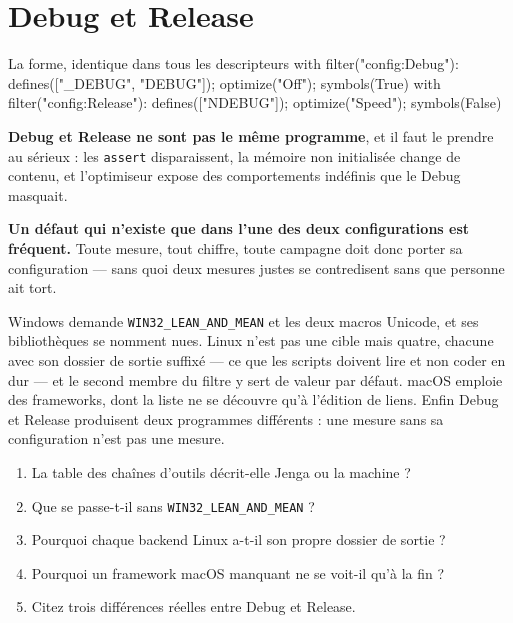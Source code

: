 \section{Debug et Release}

\begin{nkcode}{La forme, identique dans tous les descripteurs}
with filter("config:Debug"):
    defines(["_DEBUG", "DEBUG"]); optimize("Off");   symbols(True)
with filter("config:Release"):
    defines(["NDEBUG"]);          optimize("Speed"); symbols(False)
\end{nkcode}

\begin{nkretenir}
\textbf{Debug et Release ne sont pas le même programme}, et il faut le prendre au
sérieux : les \texttt{assert} disparaissent, la mémoire non initialisée change de
contenu, et l'optimiseur expose des comportements indéfinis que le Debug
masquait.

\textbf{Un défaut qui n'existe que dans l'une des deux configurations est
fréquent.} Toute mesure, tout chiffre, toute campagne doit donc porter sa
configuration --- sans quoi deux mesures justes se contredisent sans que
personne ait tort.
\end{nkretenir}

\begin{nkbilan}
Windows demande \texttt{WIN32\_LEAN\_AND\_MEAN} et les deux macros Unicode, et
ses bibliothèques se nomment nues. Linux n'est pas une cible mais quatre, chacune
avec son dossier de sortie suffixé --- ce que les scripts doivent lire et non
coder en dur --- et le second membre du filtre y sert de valeur par défaut. macOS
emploie des frameworks, dont la liste ne se découvre qu'à l'édition de liens.
Enfin Debug et Release produisent deux programmes différents : une mesure sans sa
configuration n'est pas une mesure.
\end{nkbilan}

\begin{nkquestions}
\begin{enumerate}
\item La table des chaînes d'outils décrit-elle Jenga ou la machine ?
\item Que se passe-t-il sans \texttt{WIN32\_LEAN\_AND\_MEAN} ?
\item Pourquoi chaque backend Linux a-t-il son propre dossier de sortie ?
\item Pourquoi un framework macOS manquant ne se voit-il qu'à la fin ?
\item Citez trois différences réelles entre Debug et Release.
\end{enumerate}
\end{nkquestions}

